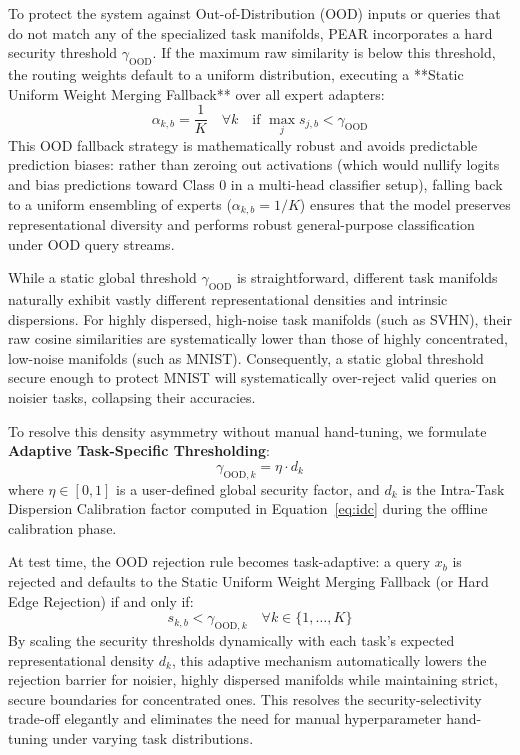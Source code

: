 To protect the system against Out-of-Distribution (OOD) inputs or queries that do not match any of the specialized task manifolds, PEAR incorporates a hard security threshold $\gamma_{\text{OOD}}$. If the maximum raw similarity is below this threshold, the routing weights default to a uniform distribution, executing a **Static Uniform Weight Merging Fallback** over all expert adapters:
\begin{equation}
    \alpha_{k, b} = \frac{1}{K} \quad \forall k \quad \text{if } \max_{j} s_{j, b} < \gamma_{\text{OOD}}
\end{equation}
This OOD fallback strategy is mathematically robust and avoids predictable prediction biases: rather than zeroing out activations (which would nullify logits and bias predictions toward Class 0 in a multi-head classifier setup), falling back to a uniform ensembling of experts ($\alpha_{k, b} = 1/K$) ensures that the model preserves representational diversity and performs robust general-purpose classification under OOD query streams.

While a static global threshold $\gamma_{\text{OOD}}$ is straightforward, different task manifolds naturally exhibit vastly different representational densities and intrinsic dispersions. For highly dispersed, high-noise task manifolds (such as SVHN), their raw cosine similarities are systematically lower than those of highly concentrated, low-noise manifolds (such as MNIST). Consequently, a static global threshold secure enough to protect MNIST will systematically over-reject valid queries on noisier tasks, collapsing their accuracies.

To resolve this density asymmetry without manual hand-tuning, we formulate \textbf{Adaptive Task-Specific Thresholding}:
\begin{equation}
    \gamma_{\text{OOD}, k} = \eta \cdot d_k
\end{equation}
where $\eta \in [0, 1]$ is a user-defined global security factor, and $d_k$ is the Intra-Task Dispersion Calibration factor computed in Equation~\ref{eq:idc} during the offline calibration phase.

At test time, the OOD rejection rule becomes task-adaptive: a query $x_b$ is rejected and defaults to the Static Uniform Weight Merging Fallback (or Hard Edge Rejection) if and only if:
\begin{equation}
    s_{k, b} < \gamma_{\text{OOD}, k} \quad \forall k \in \{1, \dots, K\}
\end{equation}
By scaling the security thresholds dynamically with each task's expected representational density $d_k$, this adaptive mechanism automatically lowers the rejection barrier for noisier, highly dispersed manifolds while maintaining strict, secure boundaries for concentrated ones. This resolves the security-selectivity trade-off elegantly and eliminates the need for manual hyperparameter hand-tuning under varying task distributions.

